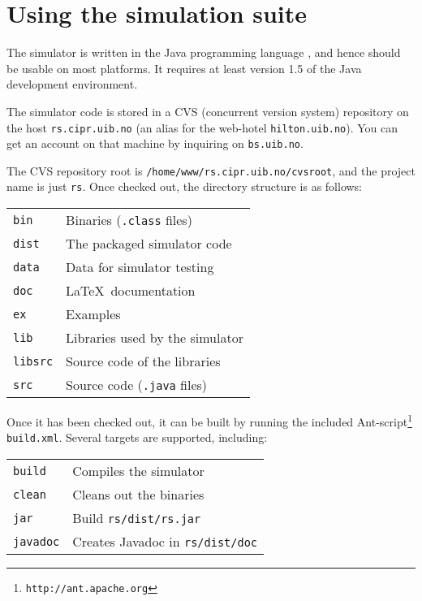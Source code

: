 \chapter{Using the simulation suite}

\minitoc

The simulator is written in the Java programming language \cite{java},
and hence should be usable on most platforms. It requires at least
version 1.5 of the Java development environment.



The simulator code is stored in a CVS (concurrent version system)
repository on the host \texttt{rs.cipr.uib.no} (an alias for the
web-hotel \texttt{hilton.uib.no}). You can get an account on that
machine by inquiring on \texttt{bs.uib.no}.

The CVS repository root is \texttt{/home/www/rs.cipr.uib.no/cvsroot},
and the project name is just \texttt{rs}. Once checked out, the
directory structure is as follows:

\begin{tabular}[c]{ll}
  \texttt{bin}    & Binaries (\texttt{.class} files) \\
  \texttt{dist}   & The packaged simulator code \\
  \texttt{data}   & Data for simulator testing \\
  \texttt{doc}    & \LaTeX\ documentation \\
  \texttt{ex}     & Examples \\
  \texttt{lib}    & Libraries used by the simulator \\
  \texttt{libsrc} & Source code of the libraries \\
  \texttt{src}    & Source code (\texttt{.java} files)
\end{tabular}

Once it has been checked out, it can be built by running the included
Ant-script\footnote{\texttt{http://ant.apache.org}}
\texttt{build.xml}. Several targets are supported, including:

\begin{tabular}[c]{ll}
  \texttt{build} & Compiles the simulator \\
  \texttt{clean} & Cleans out the binaries \\
  \texttt{jar} & Build \texttt{rs/dist/rs.jar} \\
  \texttt{javadoc} & Creates Javadoc in \texttt{rs/dist/doc}
\end{tabular}

